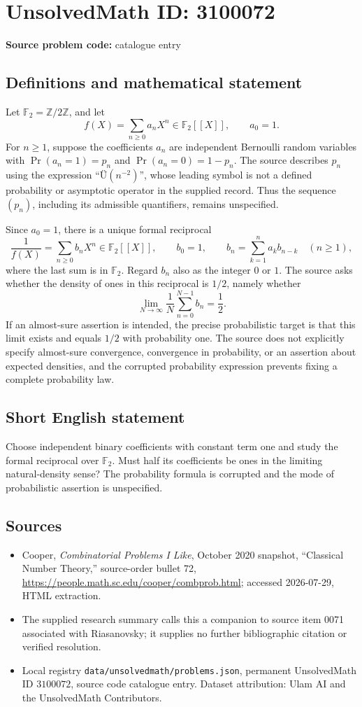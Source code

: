 \documentclass[11pt]{article}
\begin{document}
\section*{UnsolvedMath ID: 3100072}
\textbf{Source problem code:} catalogue entry
\subsection{Definitions and mathematical statement}
Let $\mathbb F_2=\mathbb Z/2\mathbb Z$, and let
\[
f(X)=\sum_{n\geq0}a_nX^n\in\mathbb F_2[[X]],\qquad a_0=1.
\]
For $n\geq1$, suppose the coefficients $a_n$ are independent Bernoulli random variables with $\Pr(a_n=1)=p_n$ and $\Pr(a_n=0)=1-p_n$. The source describes $p_n$ using the expression ``\textnormal{Ü}$(n^{-2})$'', whose leading symbol is not a defined probability or asymptotic operator in the supplied record. Thus the sequence $(p_n)$, including its admissible quantifiers, remains unspecified.

Since $a_0=1$, there is a unique formal reciprocal
\[
\frac1{f(X)}=\sum_{n\geq0}b_nX^n\in\mathbb F_2[[X]],
\qquad b_0=1,\qquad
b_n=\sum_{k=1}^n a_k b_{n-k}\quad(n\geq1),
\]
where the last sum is in $\mathbb F_2$. Regard $b_n$ also as the integer $0$ or $1$. The source asks whether the density of ones in this reciprocal is $1/2$, namely whether
\[
\lim_{N\to\infty}\frac1N\sum_{n=0}^{N-1}b_n=\frac12.
\]
If an almost-sure assertion is intended, the precise probabilistic target is that this limit exists and equals $1/2$ with probability one. The source does not explicitly specify almost-sure convergence, convergence in probability, or an assertion about expected densities, and the corrupted probability expression prevents fixing a complete probability law.
\subsection{Short English statement}
Choose independent binary coefficients with constant term one and study the formal reciprocal over $\mathbb F_2$. Must half its coefficients be ones in the limiting natural-density sense? The probability formula is corrupted and the mode of probabilistic assertion is unspecified.
\subsection{Sources}
\begin{itemize}
\item Cooper, \emph{Combinatorial Problems I Like}, October 2020 snapshot, ``Classical Number Theory,'' source-order bullet 72, \url{https://people.math.sc.edu/cooper/combprob.html}; accessed 2026-07-29, HTML extraction.
\item The supplied research summary calls this a companion to source item 0071 associated with Riasanovsky; it supplies no further bibliographic citation or verified resolution.
\item Local registry \texttt{data/unsolvedmath/problems.json}, permanent UnsolvedMath ID $3100072$, source code catalogue entry. Dataset attribution: Ulam AI and the UnsolvedMath Contributors.
\end{itemize}
\end{document}
